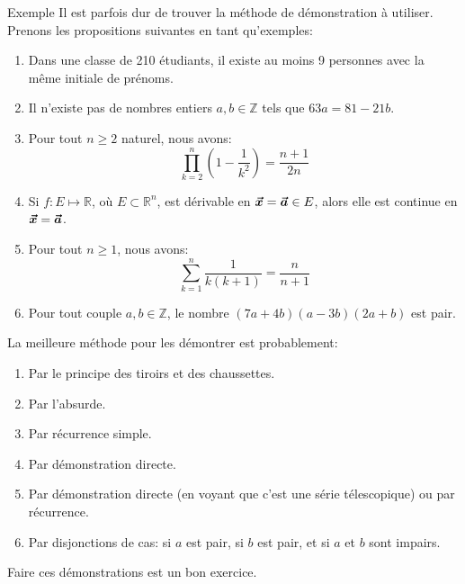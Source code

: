 \documentclass[a4paper]{article}
\begin{document}
\begin{parag}{Exemple}
    Il est parfois dur de trouver la méthode de démonstration à utiliser. Prenons les propositions suivantes en tant qu'exemples:
    \begin{enumerate}
        \item Dans une classe de 210 étudiants, il existe au moins 9 personnes avec la même initiale de prénoms.
        \item Il n'existe pas de nombres entiers $a, b \in \mathbb{Z}$ tels que $63a = 81 - 21b$.
        \item Pour tout $n \geq 2$ naturel, nous avons: 
            \[\prod_{k=2}^{n} \left(1 - \frac{1}{k^2}\right) = \frac{n+1}{2n}\]
        \item Si $f: E \mapsto \mathbb{R}$, où $E \subset \mathbb{R}^n$, est dérivable en $\bm{\protect\vec{x}}= \bm{\protect\vec{a}} \in E$, alors elle est continue en $\bm{\protect\vec{x}} = \bm{\protect\vec{a}}$.
        \item Pour tout $n \geq 1$, nous avons: 
            \[\sum_{k=1}^{n} \frac{1}{k\left(k+1\right)} = \frac{n}{n+1}\]
        \item Pour tout couple $a, b \in \mathbb{Z}$, le nombre $\left(7a + 4b\right)\left(a - 3b\right)\left(2a + b\right)$ est pair.
    \end{enumerate}

    \vspace{1em}

    La meilleure méthode pour les démontrer est probablement:
    \begin{enumerate}
        \item Par le principe des tiroirs et des chaussettes.
        \item Par l'absurde.
        \item Par récurrence simple.
        \item Par démonstration directe.
        \item Par démonstration directe (en voyant que c'est une série télescopique) ou par récurrence.
        \item Par disjonctions de cas: si $a$ est pair, si $b$ est pair, et si $a$ et $b$ sont impairs.
    \end{enumerate}
    
    Faire ces démonstrations est un bon exercice.
\end{parag}
\end{document}
